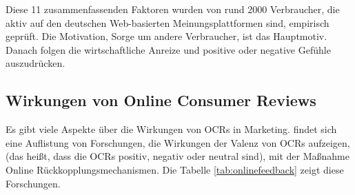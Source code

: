 Diese 11 zusammenfassenden Faktoren wurden von rund 2000 Verbraucher, die aktiv auf den deutschen Web-basierten Meinungsplattformen sind, empirisch geprüft. Die Motivation, Sorge um andere Verbraucher, ist das Hauptmotiv. Danach folgen die wirtschaftliche Anreize und positive oder negative Gefühle auszudrücken. \citep{Hennig-Thurau2004a}
\subsection{Wirkungen von Online Consumer Reviews} \label{sec:auswirkung}
Es gibt viele Aspekte über die Wirkungen von \ac{OCRs} in Marketing. \citet{Dellarocas2003} findet sich eine Auflistung von Forschungen, die Wirkungen der Valenz von \ac{OCRs} aufzeigen, (das heißt, dass die \ac{OCRs} positiv, negativ oder neutral sind),  mit der Maßnahme Online Rückkopplungsmechanismen. Die Tabelle \ref{tab:onlinefeedback} zeigt diese Forschungen.
